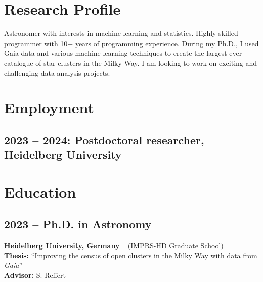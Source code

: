 \documentclass[12pt, letterpaper]{hunt-cv}
\begin{document}
\thispagestyle{plain}  %

\cvTitle

\section*{Research Profile}

Astronomer with interests in machine learning and statistics. Highly skilled programmer with 10+ years of programming experience. During my Ph.D., I used Gaia data and various machine learning techniques to create the largest ever catalogue of star clusters in the Milky Way. I am looking to work on exciting and challenging data analysis projects.


\section*{Employment}

\subsection*{2023 -- 2024: Postdoctoral researcher, Heidelberg University}



\vspace{0.8cm}


\section*{Education}

\subsection*{2023 -- Ph.D. in Astronomy}
\begin{addmargin}[1em]{0em}
    \textbf{Heidelberg University, Germany} ~ (IMPRS-HD Graduate School)\\
    \textbf{Thesis:} ``Improving the census of open clusters in the Milky Way with data from \emph{Gaia}''\\
    \textbf{Advisor:} S. Reffert
\end{addmargin}
\end{document}
